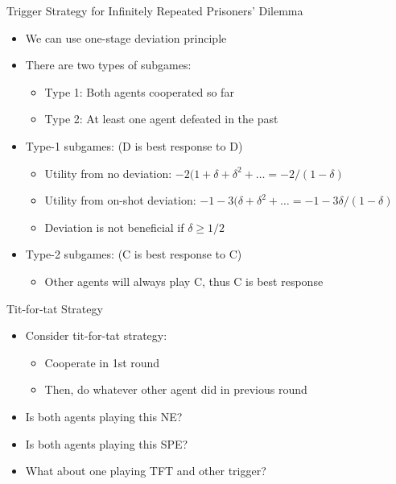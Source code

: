 \documentclass[11pt,aspectratio=169,handout]{beamer}
\begin{document}
  
  \begin{frame}{Trigger Strategy for Infinitely Repeated Prisoners' Dilemma}
   \begin{itemize}[<+->]
   \setlength{\itemsep}{0.7em}
    \item We can use one-stage deviation principle
    \item There are two types of subgames:
    \begin{itemize}[<.->]
     \item Type 1: Both agents cooperated so far
     \item Type 2: At least one agent defeated in the past
    \end{itemize}
    \item Type-1 subgames: (D is best response to D)
    \begin{itemize}
     \item Utility from no deviation: $-2 (1 + \delta + \delta^{2} + \dots = - 2/(1 - \delta )$
     \item Utility from on-shot deviation: $-1 - 3(\delta + \delta^{2} + \dots = - 1 - 3\delta/(1 - \delta )$
     \item Deviation is not beneficial if $\delta  \geq  1/2$
    \end{itemize}
    \item Type-2 subgames: (C is best response to C)
    \begin{itemize}
     \item Other agents will always play C, thus C is best response
    \end{itemize}  
   \end{itemize}
  \end{frame}    
    
  \begin{frame}{Tit-for-tat Strategy}
   \begin{itemize}[<+->]
   \setlength{\itemsep}{1.2em}
    \item Consider \alert{tit-for-tat} strategy:
    \begin{itemize}[<.->]
     \item Cooperate in 1st round
     \item Then, do whatever other agent did in previous round
    \end{itemize}
    \item Is both agents playing this NE?
    \item Is both agents playing this SPE?
    \item What about one playing TFT and other trigger?
   \end{itemize}
  \end{frame}
  
\end{document}

